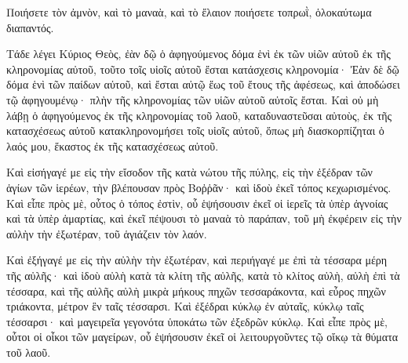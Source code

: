 {Ποιήσετε τὸν ἀμνὸν, καὶ τὸ μαναὰ, καὶ τὸ ἔλαιον ποιήσετε τοπρωῒ, ὁλοκαύτωμα διαπαντός.
\par }{\PP {}Τάδε λέγει Κύριος Θεὸς, ἐὰν δῷ ὁ ἀφηγούμενος δόμα ἑνὶ ἐκ τῶν υἱῶν αὐτοῦ ἐκ τῆς κληρονομίας αὐτοῦ, τοῦτο τοῖς υἱοῖς αὐτοῦ ἔσται κατάσχεσις κληρονομία·
Ἐὰν δὲ δῷ δόμα ἑνὶ τῶν παίδων αὐτοῦ, καὶ ἔσται αὐτῷ ἕως τοῦ ἔτους τῆς ἀφέσεως, καὶ ἀποδώσει τῷ ἀφηγουμένῳ· πλὴν τῆς κληρονομίας τῶν υἱῶν αὐτοῦ αὐτοῖς ἔσται.
Καὶ οὐ μὴ λάβῃ ὁ ἀφηγούμενος ἐκ τῆς κληρονομίας τοῦ λαοῦ, καταδυναστεῦσαι αὐτοὺς, ἐκ τῆς κατασχέσεως αὐτοῦ κατακληρονομήσει τοῖς υἱοῖς αὐτοῦ, ὅπως μὴ διασκορπίζηται ὁ λαός μου, ἕκαστος ἐκ τῆς κατασχέσεως αὐτοῦ.
\par }{\PP {}Καὶ εἰσήγαγέ με εἰς τὴν εἴσοδον τῆς κατὰ νώτου τῆς πύλης, εἰς τὴν ἐξέδραν τῶν ἁγίων τῶν ἱερέων, τὴν βλέπουσαν πρὸς Βοῤῥᾶν· καὶ ἰδοὺ ἐκεῖ τόπος κεχωρισμένος.
Καὶ εἶπε πρὸς μὲ, οὗτος ὁ τόπος ἐστὶν, οὗ ἑψήσουσιν ἐκεῖ οἱ ἱερεῖς τὰ ὑπὲρ ἀγνοίας καὶ τὰ ὑπὲρ ἁμαρτίας, καὶ ἐκεῖ πέψουσι τὸ μαναὰ τὸ παράπαν, τοῦ μὴ ἐκφέρειν εἰς τὴν αὐλὴν τὴν ἐξωτέραν, τοῦ ἁγιάζειν τὸν λαόν.
\par }{\PP {}Καὶ ἐξήγαγέ με εἰς τὴν αὐλὴν τὴν ἐξωτέραν, καὶ περιήγαγέ με ἐπὶ τὰ τέσσαρα μέρη τῆς αὐλῆς· καὶ ἰδοὺ αὐλὴ κατὰ τὰ κλίτη τῆς αὐλῆς,
κατὰ τὸ κλίτος αὐλὴ, αὐλὴ ἐπὶ τὰ τέσσαρα, καὶ τῆς αὐλῆς αὐλὴ μικρὰ μήκους πηχῶν τεσσαράκοντα, καὶ εὖρος πηχῶν τριάκοντα, μέτρον ἓν ταῖς τέσσαρσι.
Καὶ ἐξέδραι κύκλῳ ἐν αὐταῖς, κύκλῳ ταῖς τέσσαρσι· καὶ μαγειρεῖα γεγονότα ὑποκάτω τῶν ἐξεδρῶν κύκλῳ.
Καὶ εἶπε πρὸς μὲ, οὗτοι οἱ οἶκοι τῶν μαγείρων, οὗ ἑψήσουσιν ἐκεῖ οἱ λειτουργοῦντες τῷ οἴκῳ τὰ θύματα τοῦ λαοῦ.

}
